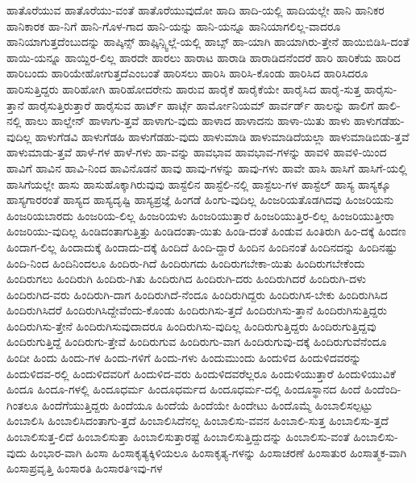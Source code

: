 {ಹಾತೊರೆಯುವ
ಹಾತೊರೆಯು-ವಂತೆ
ಹಾತೊರೆಯುವುದೋ
ಹಾದಿ
ಹಾದಿ-ಯಲ್ಲಿ
ಹಾದಿಯಲ್ಲೇ
ಹಾನಿ
ಹಾನಿಕರ
ಹಾನಿಕಾರಕ
ಹಾ-ನಿಗೆ
ಹಾನಿ-ಗೊಳ-ಗಾದ
ಹಾನಿ-ಯನ್ನು
ಹಾನಿ-ಯನ್ನೂ
ಹಾನಿಯಾಗಲಿಲ್ಲ-ವಾದರೂ
ಹಾನಿಯಾಗುತ್ತದೆಂಬುದನ್ನು
ಹಾಪ್ಕಿನ್ಸ್
ಹಾಫ್ಕಿನ್ಸ್ವಿಲ್ಲೆ-ಯಲ್ಲಿ
ಹಾಬ್ಸ್
ಹಾ-ಯಾಗಿ
ಹಾಯಾಗಿರು-ತ್ತೇನೆ
ಹಾಯಿಬಿಡಿಸಿ-ದಂತೆ
ಹಾಯಿ-ಯನ್ನೂ
ಹಾಯ್ದಿರ-ಲಿಲ್ಲ
ಹಾರದೇ
ಹಾರಲು
ಹಾರಾಟ
ಹಾರಾಡಿ
ಹಾರಾಡಿದನೆಂದರೆ
ಹಾರಿ
ಹಾರಿಕೆಯ
ಹಾರಿದ
ಹಾರಿಬಂದು
ಹಾರಿಯೇಹೋಗುತ್ತದೆಎಂಬಂತೆ
ಹಾರಿಸಲು
ಹಾರಿಸಿ
ಹಾರಿಸಿ-ಕೊಂಡು
ಹಾರಿಸಿದ
ಹಾರಿಸಿದರೂ
ಹಾರಿಸುತ್ತಿದ್ದರು
ಹಾರಿಹೋಗಿ
ಹಾರಿಹೋದರೇನು
ಹಾರುವ
ಹಾರೈಕೆ
ಹಾರೈಕೆಯೇ
ಹಾರೈಸಿದ
ಹಾರೈ-ಸುತ್ತ
ಹಾರೈಸು-ತ್ತಾನೆ
ಹಾರೈಸುತ್ತಿರುತ್ತಾರೆ
ಹಾರೈಸುವ
ಹಾರ್ಟ್
ಹಾರ್ಟ್ಗೆ
ಹಾರ್ಮೋನಿಯಮ್
ಹಾರ್ವರ್ಡ್
ಹಾಲನ್ನು
ಹಾಲಿಗೆ
ಹಾಲಿ-ನಲ್ಲಿ
ಹಾಲು
ಹಾಲ್ಡೇನ್
ಹಾಳಾಗು-ತ್ತವೆ
ಹಾಳಾಗು-ವುದು
ಹಾಳಾದ
ಹಾಳಾದನು
ಹಾಳಾ-ಯಿತು
ಹಾಳು
ಹಾಳುಗಡೆಹು-ವುದಿಲ್ಲ
ಹಾಳುಗೆಡವಿ
ಹಾಳುಗೆಡಹಿ
ಹಾಳುಗೆಡಹು-ವುದು
ಹಾಳುಮಾಡಿ
ಹಾಳುಮಾಡಿದೆಯಲ್ಲಾ
ಹಾಳುಮಾಡಿಬಿಡು-ತ್ತವೆ
ಹಾಳುಮಾಡು-ತ್ತವೆ
ಹಾಳೆ-ಗಳ
ಹಾಳೆ-ಗಳು
ಹಾ-ವನ್ನು
ಹಾವಭಾವ
ಹಾವಭಾವ-ಗಳನ್ನು
ಹಾವಳಿ
ಹಾವಳಿ-ಯಿಂದ
ಹಾವಿಗೆ
ಹಾವಿನ
ಹಾವಿ-ನಿಂದ
ಹಾವಿನೊಡನೆ
ಹಾವು
ಹಾವು-ಗಳನ್ನು
ಹಾವು-ಗಳು
ಹಾವೇ
ಹಾಸಿ
ಹಾಸಿಗೆ
ಹಾಸಿಗೆ-ಯಲ್ಲಿ
ಹಾಸಿಗೆಯಲ್ಲೇ
ಹಾಸು
ಹಾಸುಹೊಕ್ಕಾಗಿರುವುವು
ಹಾಸ್ಟೆಲಿನ
ಹಾಸ್ಟೆಲಿ-ನಲ್ಲಿ
ಹಾಸ್ಟೆಲು-ಗಳ
ಹಾಸ್ಟೆಲ್
ಹಾಸ್ಯ
ಹಾಸ್ಯಕ್ಕೂ
ಹಾಸ್ಯಗಾರರಂತೆ
ಹಾಸ್ಯದ
ಹಾಸ್ಯದೃಷ್ಟಿ
ಹಾಸ್ಯಪ್ರಜ್ಞೆ
ಹಿಂಗಡೆ
ಹಿಂಗು-ವುದಿಲ್ಲ
ಹಿಂಜರಿಯತೊಡಗಿದವು
ಹಿಂಜರಿಯನು
ಹಿಂಜರಿಯಬಾರದು
ಹಿಂಜರಿಯ-ಲಿಲ್ಲ
ಹಿಂಜರಿಯಳು
ಹಿಂಜರಿಯುತ್ತಾರೆ
ಹಿಂಜರಿಯುತ್ತಿರ-ಲಿಲ್ಲ
ಹಿಂಜರಿಯುತ್ತೀರಾ
ಹಿಂಜರಿಯು-ವುದಿಲ್ಲ
ಹಿಂಡಿದಂತಾಗುತ್ತಿತ್ತು
ಹಿಂಡಿದಂತಾ-ಯಿತು
ಹಿಂಡಿ-ದಂತೆ
ಹಿಂಡುವ
ಹಿಂತಿರುಗಿ
ಹಿಂ-ದಕ್ಕೆ
ಹಿಂದಣ
ಹಿಂದಾಗ-ಲಿಲ್ಲ
ಹಿಂದಾದುಕ್ಕೆ
ಹಿಂದಾದು-ದಕ್ಕೆ
ಹಿಂದಿದೆ
ಹಿಂದಿ-ದ್ದಾರೆ
ಹಿಂದಿನ
ಹಿಂದಿನಂತೆ
ಹಿಂದಿನದನ್ನು
ಹಿಂದಿನಷ್ಟು
ಹಿಂದಿ-ನಿಂದ
ಹಿಂದಿನಿಂದಲೂ
ಹಿಂದಿರು-ಗಿದೆ
ಹಿಂದಿರುಗದು
ಹಿಂದಿರುಗಬೇಕಾ-ಯಿತು
ಹಿಂದಿರುಗಬೇಕೆಂದು
ಹಿಂದಿರುಗಲು
ಹಿಂದಿರುಗಿ
ಹಿಂದಿರು-ಗಿತು
ಹಿಂದಿರುಗಿದ
ಹಿಂದಿರುಗಿ-ದರು
ಹಿಂದಿರುಗಿದರೆ
ಹಿಂದಿರುಗಿ-ದಳು
ಹಿಂದಿರುಗಿದ-ವರು
ಹಿಂದಿರುಗಿ-ದಾಗ
ಹಿಂದಿರುಗಿದೆ-ನೆಂದೂ
ಹಿಂದಿರುಗಿದ್ದರು
ಹಿಂದಿರುಗಿಸ-ಬೇಕು
ಹಿಂದಿರುಗಿಸಿದ
ಹಿಂದಿರುಗಿಸಿದರೆ
ಹಿಂದಿರುಗಿಸಿದ್ದೇವೆಂದು-ಕೊಂಡು
ಹಿಂದಿರುಗಿಸು-ತ್ತದೆ
ಹಿಂದಿರುಗಿಸು-ತ್ತಾನೆ
ಹಿಂದಿರುಗಿಸುತ್ತಿದ್ದರು
ಹಿಂದಿರುಗಿಸು-ತ್ತೇನೆ
ಹಿಂದಿರುಗಿಸುವುದಾದರೂ
ಹಿಂದಿರುಗಿಸು-ವುದಿಲ್ಲ
ಹಿಂದಿರುಗುತ್ತಿದ್ದರು
ಹಿಂದಿರುಗುತ್ತಿದ್ದವು
ಹಿಂದಿರುಗುತ್ತಿದ್ದೆ
ಹಿಂದಿರುಗು-ತ್ತೇವೆ
ಹಿಂದಿರುಗುವ
ಹಿಂದಿರುಗು-ವಾಗ
ಹಿಂದಿರುಗುವು-ದಕ್ಕೆ
ಹಿಂದಿರುಗುವೆನೆಂದೂ
ಹಿಂದೀ
ಹಿಂದು
ಹಿಂದು-ಗಳ
ಹಿಂದು-ಗಳಿಗೆ
ಹಿಂದು-ಗಳು
ಹಿಂದುಮುಂದು
ಹಿಂದುಳಿದ
ಹಿಂದುಳಿದವರನ್ನು
ಹಿಂದುಳಿದವ-ರಲ್ಲಿ
ಹಿಂದುಳಿದವರಿಗೆ
ಹಿಂದುಳಿದ-ವರು
ಹಿಂದುಳಿದವರೆಲ್ಲರೂ
ಹಿಂದುಳಿಯುತ್ತಾರೆ
ಹಿಂದುಳಿಯುವಿಕೆ
ಹಿಂದೂ
ಹಿಂದೂ-ಗಳಲ್ಲಿ
ಹಿಂದೂಧರ್ಮ
ಹಿಂದೂಧರ್ಮದ
ಹಿಂದೂಧರ್ಮ-ದಲ್ಲಿ
ಹಿಂದೂಸ್ಥಾನದ
ಹಿಂದೆ
ಹಿಂದೆಂದಿ-ಗಿಂತಲೂ
ಹಿಂದೆಗೆಯುತ್ತಿದ್ದರು
ಹಿಂದೆಯೂ
ಹಿಂದೆಯೆ
ಹಿಂದೆಯೇ
ಹಿಂದೇಟು
ಹಿಂದೊಮ್ಮೆ
ಹಿಂಬಾಲಿಸಲ್ಪಟ್ಟು
ಹಿಂಬಾಲಿಸಿ
ಹಿಂಬಾಲಿಸಿದಂತಾಗು-ತ್ತದೆ
ಹಿಂಬಾಲಿಸಿದೆನಲ್ಲ
ಹಿಂಬಾಲಿಸು-ವವನ
ಹಿಂಬಾಲಿ-ಸುತ್ತ
ಹಿಂಬಾಲಿಸು-ತ್ತದೆ
ಹಿಂಬಾಲಿಸುತ್ತ-ಲಿದೆ
ಹಿಂಬಾಲಿಸುತ್ತಾ
ಹಿಂಬಾಲಿಸುತ್ತಾರಷ್ಟೆ
ಹಿಂಬಾಲಿಸುತ್ತಿದ್ದುದನ್ನು
ಹಿಂಬಾಲಿಸು-ವಂತೆ
ಹಿಂಬಾಲಿಸು-ವುದು
ಹಿಂಭಾರ-ವಾಗಿ
ಹಿಂಸಾ
ಹಿಂಸಾಕೃತ್ಯಕ್ಕಿಳಿಯಲೂ
ಹಿಂಸಾಕೃತ್ಯ-ಗಳನ್ನು
ಹಿಂಸಾಚರಣೆ
ಹಿಂಸಾತುರ
ಹಿಂಸಾತ್ಮಕ-ವಾಗಿ
ಹಿಂಸಾಪ್ರವೃತ್ತಿ
ಹಿಂಸಾರತಿ
ಹಿಂಸಾರತಿಇವು-ಗಳ
}
